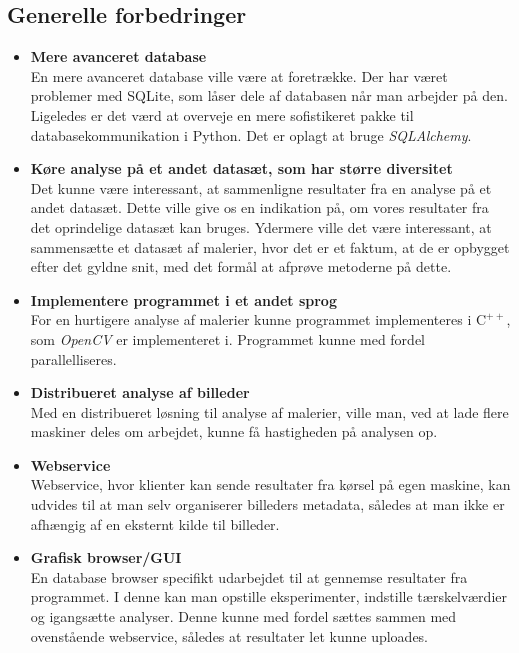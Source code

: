 {\subsection{Generelle forbedringer}
\begin{itemize}
    \item \textbf{Mere avanceret database}\\
        En mere avanceret database ville være at foretrække. Der har
        været problemer med SQLite, som låser dele af databasen når man
        arbejder på den. Ligeledes er det værd at overveje en mere
        sofistikeret pakke til databasekommunikation i Python. Det er
        oplagt at bruge \emph{SQLAlchemy}\cite{SQLAlchemy}.
    \item \textbf{Køre analyse på et andet datasæt, som har større diversitet}\\
        Det kunne være interessant, at sammenligne resultater fra en
        analyse på et andet datasæt. Dette ville give os en indikation
		på, om vores resultater fra det oprindelige datasæt kan bruges.
        Ydermere ville det være interessant, at sammensætte et datasæt
        af malerier, hvor det er et faktum, at de er opbygget efter det
        gyldne snit, med det formål at afprøve metoderne på dette.
    \item \textbf{Implementere programmet i et andet sprog}\\
        For en hurtigere analyse af malerier kunne programmet
        implementeres i $\textrm{C}^{++}$, som \emph{OpenCV} er
        implementeret i. Programmet kunne med fordel parallelliseres.
    \item \textbf{Distribueret analyse af billeder}\\
        Med en distribueret løsning til analyse af malerier, ville man,
        ved at lade flere maskiner deles om arbejdet, kunne få
        hastigheden på analysen op.
    \item \textbf{Webservice}\\
        Webservice, hvor klienter kan sende resultater fra kørsel på
        egen maskine, kan udvides til at man selv organiserer billeders
        metadata, således at man ikke er afhængig af en eksternt
        kilde til billeder.
    \item \textbf{Grafisk browser/GUI}\\
        En database browser specifikt udarbejdet til at gennemse
        resultater fra programmet. I denne kan man opstille
        eksperimenter, indstille tærskelværdier og igangsætte analyser.
        Denne kunne med fordel sættes sammen med ovenstående webservice,
        således at resultater let kunne uploades.
\end{itemize}

}
